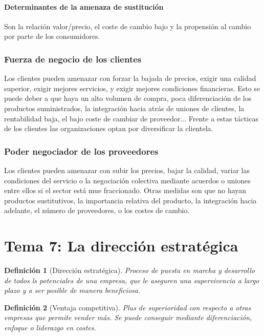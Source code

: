 \documentclass[12pt]{article}
\theoremstyle{definition_wo_parentheses}
\newtheorem{definicion}{Definición}[section]
\begin{document}
\paragraph{Determinantes de la amenaza de sustitución} Son la relación valor/precio, el coste de cambio bajo y la propensión al cambio por parte de los consumidores.

\subsubsection{Fuerza de negocio de los clientes}

Los clientes pueden amenazar con forzar la bajada de precios, exigir una calidad superior, exigir mejores servicios, y exigir mejores condiciones financieras. Esto se puede deber a que haya un alto volumen de compra, poca diferenciación de los productos suministrados, la integración hacia atrás de uniones de clientes, la rentabilidad baja, el bajo coste de cambiar de proveedor... Frente a estas tácticas de los clientes las organizaciones optan por diversificar la clientela.

\subsubsection{Poder negociador de los proveedores}

Los clientes pueden amenazar con subir los precios, bajar la calidad, variar las condiciones del servicio o la negociación colectiva mediante acuerdos o uniones entre ellos si el sector está mue fraccionado. Otras medidas son que no hayan productos sustitutivos, la importancia relativa del producto, la integración hacia adelante, el número de proveedores, o los costes de cambio.

\section{Tema 7: La dirección estratégica}

\begin{definicion}[Dirección estratégica]
	Proceso de puesta en marcha y desarrollo de todos ls potenciales de una empresa, que le aseguren una supervivencia a largo plazo y a ser posible de manera beneficiosa. 
\end{definicion}

\begin{definicion}[Ventaja competitiva]
	Plus de superioridad con respecto a otras empresas que permite vender más. Se puede conseguir mediante diferenciación, enfoque o liderazgo en costes.
\end{definicion}
\end{document}
